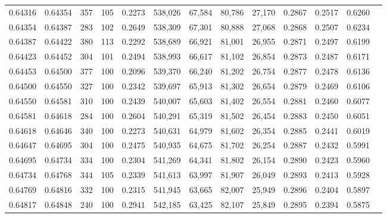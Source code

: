 \begin{tabular}{rrrrrrrrrrrrr}
0.64316 & 0.64354 &   357 & 105 &                                     0.2273 & 538,026 &  67,584 &  80,786 &  27,170 & 0.2867 & 0.2517 & 0.6260 \\
0.64354 & 0.64387 &   283 & 102 &                                     0.2649 & 538,309 &  67,301 &  80,888 &  27,068 & 0.2868 & 0.2507 & 0.6234 \\
0.64387 & 0.64422 &   380 & 113 &                                     0.2292 & 538,689 &  66,921 &  81,001 &  26,955 & 0.2871 & 0.2497 & 0.6199 \\
0.64423 & 0.64452 &   304 & 101 &                                     0.2494 & 538,993 &  66,617 &  81,102 &  26,854 & 0.2873 & 0.2487 & 0.6171 \\
0.64453 & 0.64500 &   377 & 100 &                                     0.2096 & 539,370 &  66,240 &  81,202 &  26,754 & 0.2877 & 0.2478 & 0.6136 \\
0.64500 & 0.64550 &   327 & 100 &                                     0.2342 & 539,697 &  65,913 &  81,302 &  26,654 & 0.2879 & 0.2469 & 0.6106 \\
0.64550 & 0.64581 &   310 & 100 &                                     0.2439 & 540,007 &  65,603 &  81,402 &  26,554 & 0.2881 & 0.2460 & 0.6077 \\
0.64581 & 0.64618 &   284 & 100 &                                     0.2604 & 540,291 &  65,319 &  81,502 &  26,454 & 0.2883 & 0.2450 & 0.6051 \\
0.64618 & 0.64646 &   340 & 100 &                                     0.2273 & 540,631 &  64,979 &  81,602 &  26,354 & 0.2885 & 0.2441 & 0.6019 \\
0.64647 & 0.64695 &   304 & 100 &                                     0.2475 & 540,935 &  64,675 &  81,702 &  26,254 & 0.2887 & 0.2432 & 0.5991 \\
0.64695 & 0.64734 &   334 & 100 &                                     0.2304 & 541,269 &  64,341 &  81,802 &  26,154 & 0.2890 & 0.2423 & 0.5960 \\
0.64734 & 0.64768 &   344 & 105 &                                     0.2339 & 541,613 &  63,997 &  81,907 &  26,049 & 0.2893 & 0.2413 & 0.5928 \\
0.64769 & 0.64816 &   332 & 100 &                                     0.2315 & 541,945 &  63,665 &  82,007 &  25,949 & 0.2896 & 0.2404 & 0.5897 \\
0.64817 & 0.64848 &   240 & 100 &                                     0.2941 & 542,185 &  63,425 &  82,107 &  25,849 & 0.2895 & 0.2394 & 0.5875 \\

\end{tabular}
